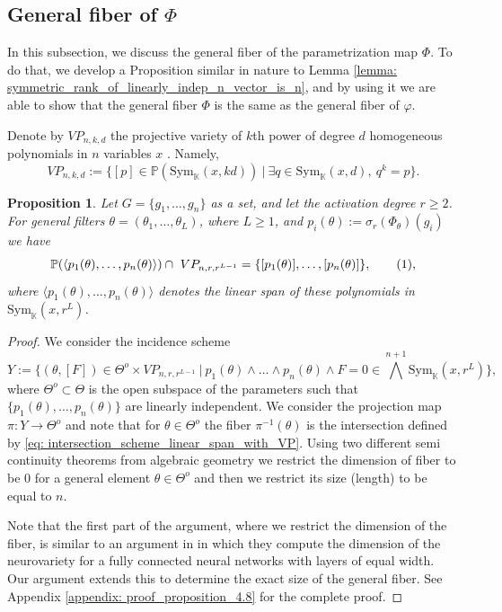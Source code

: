 \documentclass[final]{article}
\newcommand\numberthis{\addtocounter{equation}{1}\tag{\theequation}}
\newcommand{\K}{\mathbb{K}}
\newcommand{\PP}{\mathbb{P}}
\newcommand{\Sym}{\text{Sym}}
\theoremstyle{definition}
\theoremstyle{plain}
\newtheorem{proposition}[definition]{Proposition}
\begin{document}
\subsection{General fiber of \(\Phi\)}
In this subsection, we discuss the general fiber of the parametrization map $\Phi$. 
To do that, we develop a Proposition similar in nature to Lemma \ref{lemma: symmetric_rank_of_linearly_indep_n_vector_is_n}, and by using it we are able to show that the general fiber $\Phi$ is the same as the general fiber of $\varphi$. 

Denote by $VP_{n, k, d}$ the projective variety of $k$th power of degree $d$ homogeneous polynomials in $n$ variables $x$ \cite{Abdesselam_2014}. Namely,
\[
VP_{n, k, d} := \{[p] \in \PP(\Sym_\K(x, kd))\ |\ \exists q \in \Sym_\K(x, d),\ q^k = p\}.
\]


\begin{proposition}\label{prop: intersection_of_general_secant_is_trivial}
    Let $G=\{g_1, \dots, g_n\}$ as a set, and let the activation degree $r\geq 2$.
    For general filters $\theta=(\theta_1, \dots, \theta_L)$, where $L\geq 1$, and $p_i(\theta) := \sigma_r(\Phi_\theta)(g_i)$ we have
    \[
   \PP( \langle p_1(\theta), \dots, p_n(\theta) \rangle )\cap\  VP_{n, r, r^{L-1}} = \{[p_1(\theta)], \dots, [p_n(\theta)]\},
    \numberthis, \label{eq: intersection_scheme_linear_span_with_VP}\]
    where $\langle p_1(\theta), \dots, p_n(\theta)\rangle$ denotes the linear span of these polynomials in $\Sym_\K(x, r^L)$.
\end{proposition}
\begin{proof}
    We consider the incidence scheme
    \[
    Y:= \{(\theta, [F]) \in \Theta^o \times VP_{n, r, r^{L-1}}\ |\ p_1(\theta) \wedge \dots \wedge p_n(\theta) \wedge F = 0 \in \bigwedge^{n+1} \Sym_\K(x, r^L) \},
    \]
    where $\Theta^o \subset \Theta$ is the open subspace of the parameters such that $\{ p_1(\theta), \dots, p_n(\theta)\}$ are linearly independent.
    We consider the projection map $\pi: Y \to \Theta^o$ and note that for $\theta\in \Theta^o$ the fiber $\pi^{-1}(\theta)$ is the intersection defined by \eqref{eq: intersection_scheme_linear_span_with_VP}.
    Using two different semi continuity theorems from algebraic geometry we restrict the dimension of fiber to be $0$ for a general element $\theta \in \Theta^o$ and then we restrict its size (length) to be equal to $n$.

    Note that the first part of the argument, where we restrict the dimension of the fiber, is similar to an argument in \cite[Theorem 22]{finkel2025activationdegreethresholdsexpressiveness} in which they compute the dimension of the neurovariety for a fully connected neural networks with layers of equal width. Our argument extends this to determine the exact size of the general fiber.
    See Appendix \ref{appendix: proof_proposition_4.8} for the complete proof.
\end{proof}
\end{document}
